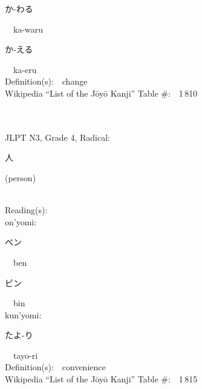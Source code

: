 \begin{multicols}{2}
{\hspace*{2em}}{\begin{CJK}{UTF8}{min} か-わる \end{CJK}}\ \ ka-waru\ \ \\
{\hspace*{2em}}{\begin{CJK}{UTF8}{min} か-える \end{CJK}}\ \ ka-eru\ \ \\
Definition(s):\ \ change \\
Wikipedia ``List of the J\=oy\=o Kanji'' Table \#:\ \ 1\,810 \\
\ \ \\
{\fontsize{34pt}{40pt}  }\ \ \\  %
{JLPT N3, Grade 4, Radical:\ \ {\begin{CJK}{UTF8}{min} 人 \end{CJK}} (person) } \\
Reading(s):\ \ \\
{\hspace*{1em}}on'yomi:\ \ \\
{\hspace*{2em}}{\begin{CJK}{UTF8}{min} ベン \end{CJK}}\ \ ben\ \ \\
{\hspace*{2em}}{\begin{CJK}{UTF8}{min} ビン \end{CJK}}\ \ bin\ \ \\
{\hspace*{1em}}kun'yomi:\ \ \\
{\hspace*{2em}}{\begin{CJK}{UTF8}{min} たよ-り \end{CJK}}\ \ tayo-ri\ \ \\
Definition(s):\ \ convenience \\
Wikipedia ``List of the J\=oy\=o Kanji'' Table \#:\ \ 1\,815 \\
\ \ \\
{\fontsize{34pt}{40pt}  }\ \ \\  %

\end{multicols}
